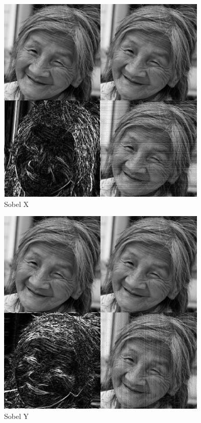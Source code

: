 \begin{figure}[H]
\begin{center}
\includegraphics[width=100mm]{u03/sobel_x.eps}
\end{center}
\caption{Sobel X}
\end{figure}

\begin{figure}[H]
\begin{center}
\includegraphics[width=100mm]{u03/sobel_y.eps}
\end{center}
\caption{Sobel Y}
\end{figure}

